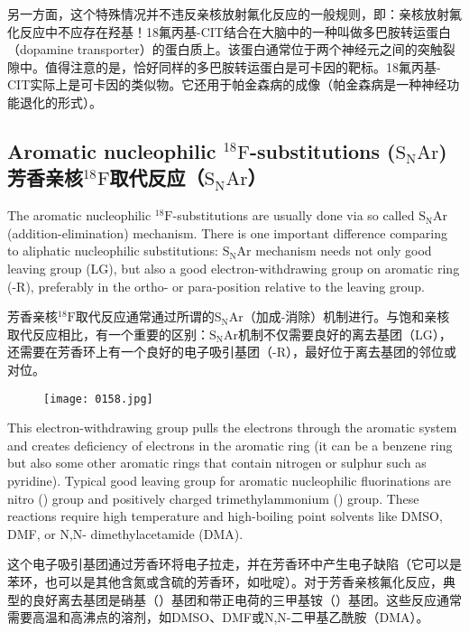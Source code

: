 \documentclass[dvipsnames, svgnames,a4paper,11pt]{article}
\begin{document}
另一方面，这个特殊情况并不违反亲核放射氟化反应的一般规则，即：亲核放射氟化反应中不应存在羟基！18氟丙基-CIT结合在大脑中的一种叫做多巴胺转运蛋白（dopamine transporter）的蛋白质上。该蛋白通常位于两个神经元之间的突触裂隙中。值得注意的是，恰好同样的多巴胺转运蛋白是可卡因的靶标。18氟丙基-CIT实际上是可卡因的类似物。它还用于帕金森病的成像（帕金森病是一种神经功能退化的形式）。

\subsection{Aromatic nucleophilic ${}^\mathrm{18}\mathrm{F}$-substitutions ($\mathrm{S_NAr}$) \\芳香亲核${}^\mathrm{18}\mathrm{F}$取代反应（$\mathrm{S_NAr}$）}
The aromatic nucleophilic ${}^\mathrm{18}\mathrm{F}$-substitutions are usually done via so called $\mathrm{S_NAr}$
(addition-elimination) mechanism. There is one important difference comparing to
aliphatic nucleophilic substitutions: $\mathrm{S_NAr}$ mechanism needs not only good leaving
group (LG), but also a good electron-withdrawing group on aromatic ring (-R),
preferably in the ortho- or para-position relative to the leaving group.

芳香亲核${}^\mathrm{18}\mathrm{F}$取代反应通常通过所谓的$\mathrm{S_NAr}$（加成-消除）机制进行。与饱和亲核取代反应相比，有一个重要的区别：$\mathrm{S_NAr}$机制不仅需要良好的离去基团（LG），还需要在芳香环上有一个良好的电子吸引基团（-R），最好位于离去基团的邻位或对位。

\begin{figure}[h]
	\centering
    \texttt{[image: 0158.jpg]}    
     \label{fig172}
\end{figure}

This electron-withdrawing group pulls the electrons through the aromatic system and
creates deficiency of electrons in the aromatic ring (it can be a benzene ring but also
some other aromatic rings that contain nitrogen or sulphur such as pyridine). Typical
good leaving group for aromatic nucleophilic fluorinations are nitro () group and positively charged trimethylammonium (\ce{-[N(Me)3]+}) group. These reactions require
high temperature and high-boiling point solvents like DMSO, DMF, or N,N-
dimethylacetamide (DMA).


这个电子吸引基团通过芳香环将电子拉走，并在芳香环中产生电子缺陷（它可以是苯环，也可以是其他含氮或含硫的芳香环，如吡啶）。对于芳香亲核氟化反应，典型的良好离去基团是硝基（）基团和带正电荷的三甲基铵（\ce{-[N(Me)3]+}）基团。这些反应通常需要高温和高沸点的溶剂，如DMSO、DMF或N,N-二甲基乙酰胺（DMA）。
\end{document}
